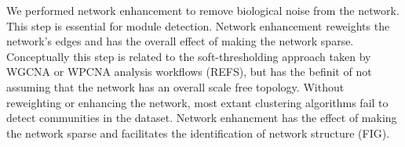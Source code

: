 \documentclass[11pt]{elife}\usepackage[]{graphicx}\usepackage[]{color}
\begin{document}
We performed network enhancement to remove biological noise from the network.
This step is essential for module detection. Network enhancement reweights the
network's edges and has the overall effect of making the network sparse.
Conceptually this step is related to the soft-thresholding approach taken by 
WGCNA or WPCNA analysis workflows (REFS), but has the befinit of not assuming
that the network has an overall scale free topology. 
Without reweighting or enhancing the network, most extant clustering 
algorithms fail to detect communities in the dataset. 
Network enhancment has the effect of making the
network sparse and facilitates the identification of network structure (FIG).\\
\end{document}
